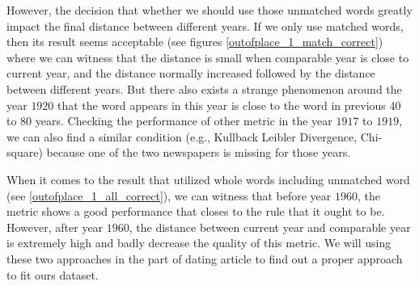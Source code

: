 However, the decision that whether we should use those unmatched words greatly impact the final distance between different years. If we only use matched words, then its result seems acceptable (see figures \ref{outofplace_1_match_correct}) where we can witness that the distance is small when comparable year is close to current year, and the distance normally increased followed by the distance between different years. But there also exists a strange phenomenon around the year $1920$ that the word appears in this year is close to the word in previous 40 to 80 years. Checking the performance of other metric in the year $1917$ to $1919$, we can also find a similar condition (e.g., Kullback Leibler Divergence, Chi-square) because one of the two newspapers is missing for those years.

When it comes to the result that utilized whole words including unmatched word (see \ref{outofplace_1_all_correct}), we can witness that before year $1960$, the metric shows a good performance that closes to the rule that it ought to be. However, after year $1960$, the distance between current year and comparable year is extremely high and badly decrease the quality of this metric. We will using these two approaches in the part of dating article to find out a proper approach to fit ours dataset.

